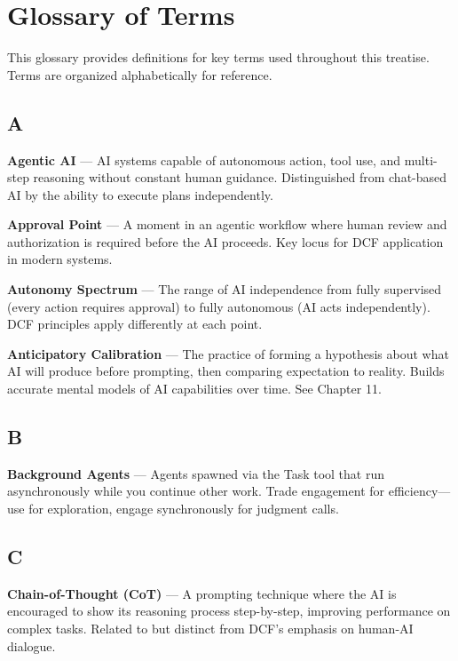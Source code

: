 \chapter{Glossary of Terms}

This glossary provides definitions for key terms used throughout this treatise. Terms are organized alphabetically for reference.

\section*{A}

\textbf{Agentic AI} --- AI systems capable of autonomous action, tool use, and multi-step reasoning without constant human guidance. Distinguished from chat-based AI by the ability to execute plans independently.

\textbf{Approval Point} --- A moment in an agentic workflow where human review and authorization is required before the AI proceeds. Key locus for DCF application in modern systems.

\textbf{Autonomy Spectrum} --- The range of AI independence from fully supervised (every action requires approval) to fully autonomous (AI acts independently). DCF principles apply differently at each point.

\textbf{Anticipatory Calibration} --- The practice of forming a hypothesis about what AI will produce before prompting, then comparing expectation to reality. Builds accurate mental models of AI capabilities over time. See Chapter 11.

\section*{B}

\textbf{Background Agents} --- Agents spawned via the Task tool that run asynchronously while you continue other work. Trade engagement for efficiency---use for exploration, engage synchronously for judgment calls.

\section*{C}

\textbf{Chain-of-Thought (CoT)} --- A prompting technique where the AI is encouraged to show its reasoning process step-by-step, improving performance on complex tasks. Related to but distinct from DCF's emphasis on human-AI dialogue.

